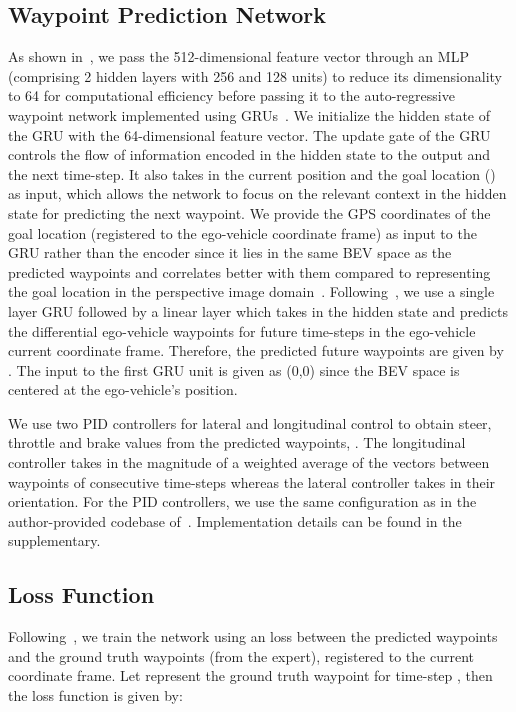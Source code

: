 \documentclass[final]{cvpr}
\newcommand{\boldparagraph}[1]{\vspace{0.1cm}\noindent{\bf #1:}}
\begin{document}
\subsection{Waypoint Prediction Network} As shown in~, we pass the 512-dimensional feature vector through an MLP (comprising 2 hidden layers with 256 and 128 units) to reduce its dimensionality to 64 for computational efficiency before passing it to the auto-regressive waypoint network implemented using GRUs~\cite{Cho2014EMNLP}. We initialize the hidden state of the GRU with the 64-dimensional feature vector. The update gate of the GRU controls the flow of information encoded in the hidden state to the output and the next time-step. It also takes in the current position and the goal location () as input, which allows the network to focus on the relevant context in the hidden state for predicting the next waypoint. We provide the GPS coordinates of the goal location (registered to the ego-vehicle coordinate frame) as input to the GRU rather than the encoder since it lies in the same BEV space as the predicted waypoints and correlates better with them compared to representing the goal location in the perspective image domain~\cite{Chen2019CORL}. Following~\cite{Filos2020ICML}, we use a single layer GRU followed by a linear layer which takes in the hidden state and predicts the differential ego-vehicle waypoints  for  future time-steps in the ego-vehicle current coordinate frame. Therefore, the predicted future waypoints are given by . The input to the first GRU unit is given as (0,0) since the BEV space is centered at the ego-vehicle's position.

\boldparagraph{Controller} We use two PID controllers for lateral and longitudinal control to obtain steer, throttle and brake values from the predicted waypoints, . The longitudinal controller takes in the magnitude of a weighted average of the vectors between waypoints of consecutive time-steps whereas the lateral controller takes in their orientation. For the PID controllers, we use the same configuration as in the author-provided codebase of~\cite{Chen2019CORL}. Implementation details can be found in the supplementary.

\subsection{Loss Function} Following~\cite{Chen2019CORL}, we train the network using an  loss between the predicted waypoints and the ground truth waypoints (from the expert), registered to the current coordinate frame. Let  represent the ground truth waypoint for time-step , then the loss function is given by:
\end{document}
